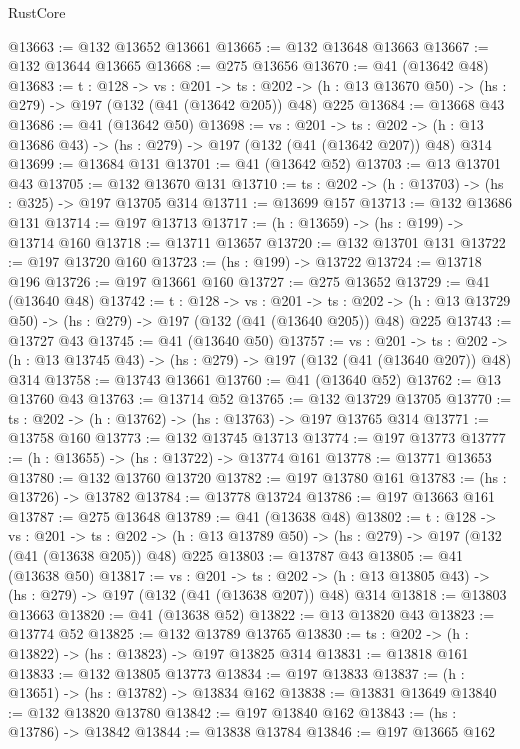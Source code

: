\begin{lexlean}{RustCore}
\begin{coremodule}
@13663 := @132 @13652 @13661
@13665 := @132 @13648 @13663
@13667 := @132 @13644 @13665
@13668 := @275 @13656
@13670 := @41 (@13642 @48)
@13683 := {t : @128} ->
  {vs : @201} ->
  {ts : @202} -> (h : @13 @13670 @50) -> (hs : @279) -> @197 (@132 (@41 (@13642 @205)) @48) @225
@13684 := @13668 @43
@13686 := @41 (@13642 @50)
@13698 := {vs : @201} ->
  {ts : @202} -> (h : @13 @13686 @43) -> (hs : @279) -> @197 (@132 (@41 (@13642 @207)) @48) @314
@13699 := @13684 @131
@13701 := @41 (@13642 @52)
@13703 := @13 @13701 @43
@13705 := @132 @13670 @131
@13710 := {ts : @202} -> (h : @13703) -> (hs : @325) -> @197 @13705 @314
@13711 := @13699 @157
@13713 := @132 @13686 @131
@13714 := @197 @13713
@13717 := (h : @13659) -> (hs : @199) -> @13714 @160
@13718 := @13711 @13657
@13720 := @132 @13701 @131
@13722 := @197 @13720 @160
@13723 := (hs : @199) -> @13722
@13724 := @13718 @196
@13726 := @197 @13661 @160
@13727 := @275 @13652
@13729 := @41 (@13640 @48)
@13742 := {t : @128} ->
  {vs : @201} ->
  {ts : @202} -> (h : @13 @13729 @50) -> (hs : @279) -> @197 (@132 (@41 (@13640 @205)) @48) @225
@13743 := @13727 @43
@13745 := @41 (@13640 @50)
@13757 := {vs : @201} ->
  {ts : @202} -> (h : @13 @13745 @43) -> (hs : @279) -> @197 (@132 (@41 (@13640 @207)) @48) @314
@13758 := @13743 @13661
@13760 := @41 (@13640 @52)
@13762 := @13 @13760 @43
@13763 := @13714 @52
@13765 := @132 @13729 @13705
@13770 := {ts : @202} -> (h : @13762) -> (hs : @13763) -> @197 @13765 @314
@13771 := @13758 @160
@13773 := @132 @13745 @13713
@13774 := @197 @13773
@13777 := (h : @13655) -> (hs : @13722) -> @13774 @161
@13778 := @13771 @13653
@13780 := @132 @13760 @13720
@13782 := @197 @13780 @161
@13783 := (hs : @13726) -> @13782
@13784 := @13778 @13724
@13786 := @197 @13663 @161
@13787 := @275 @13648
@13789 := @41 (@13638 @48)
@13802 := {t : @128} ->
  {vs : @201} ->
  {ts : @202} -> (h : @13 @13789 @50) -> (hs : @279) -> @197 (@132 (@41 (@13638 @205)) @48) @225
@13803 := @13787 @43
@13805 := @41 (@13638 @50)
@13817 := {vs : @201} ->
  {ts : @202} -> (h : @13 @13805 @43) -> (hs : @279) -> @197 (@132 (@41 (@13638 @207)) @48) @314
@13818 := @13803 @13663
@13820 := @41 (@13638 @52)
@13822 := @13 @13820 @43
@13823 := @13774 @52
@13825 := @132 @13789 @13765
@13830 := {ts : @202} -> (h : @13822) -> (hs : @13823) -> @197 @13825 @314
@13831 := @13818 @161
@13833 := @132 @13805 @13773
@13834 := @197 @13833
@13837 := (h : @13651) -> (hs : @13782) -> @13834 @162
@13838 := @13831 @13649
@13840 := @132 @13820 @13780
@13842 := @197 @13840 @162
@13843 := (hs : @13786) -> @13842
@13844 := @13838 @13784
@13846 := @197 @13665 @162

\end{coremodule}
\end{lexlean}
